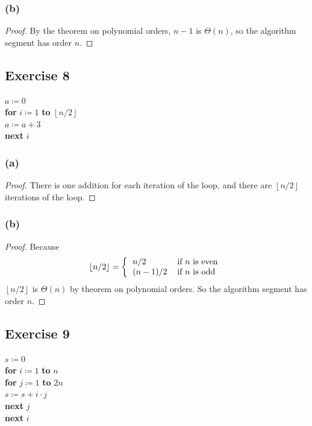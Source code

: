 \documentclass[14pt]{extarticle}
\newcommand{\floor}[1]{{\left\lfloor#1\right\rfloor}}
\begin{document}
\subsubsection{(b)}
\begin{proof}
    By the theorem on polynomial orders, \(n - 1\) is \(\Theta(n)\), so the algorithm segment has order \(n\).
\end{proof}

\subsection{Exercise 8}
\begin{tabbing}
    \(a \coloneqq 0\) \\
    {\bf for} \= \(i \coloneqq 1\) {\bf to} \(\floor{n/2}\) \\
    \> \(a \coloneqq a + 3\) \\
    {\bf next} \(i\)
\end{tabbing}

\subsubsection{(a)}
\begin{proof}
    There is one addition for each iteration of the loop, and there are \(\floor{n/2}\) iterations of the loop.
\end{proof}

\subsubsection{(b)}
\begin{proof}
    Because
    \[
        \floor{n/2} =
        \left\{
        \begin{tabular}{ll}
            \(n/2\)     & if \(n\) is even \\
            \((n-1)/2\) & if \(n\) is odd
        \end{tabular}
        \right.
    \]
    \(\floor{n/2}\) is \(\Theta(n)\) by theorem on polynomial orders. So the algorithm segment has order \(n\).
\end{proof}

\subsection{Exercise 9}
\begin{tabbing}
    \(s \coloneqq 0\) \\
    {\bf for} \= \(i \coloneqq 1\) {\bf to} \(n\) \\
    \> {\bf for} \= \(j \coloneqq 1\) {\bf to} \(2n\) \\
    \>           \> \(s \coloneqq s + i \cdot j\) \\
    \> {\bf next} \(j\) \\
    {\bf next} \(i\)
\end{tabbing}
\end{document}
